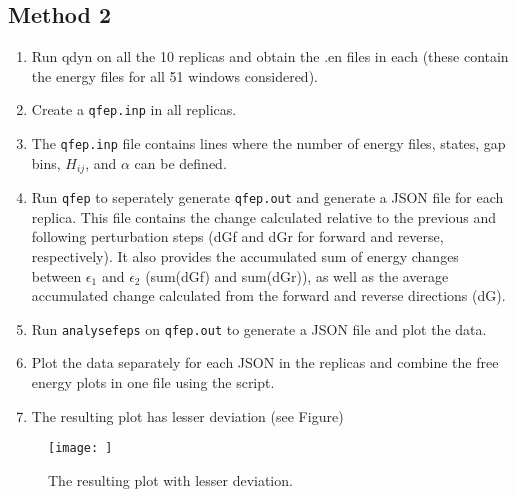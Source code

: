 \documentclass{article}
\begin{document}
\subsection{Method 2}

\begin{enumerate}
    \item Run qdyn on all the 10 replicas and obtain the .en files in each (these contain the energy files for all 51 windows considered).
    \item Create a \texttt{qfep.inp} in all replicas.
     \item The \texttt{qfep.inp} file contains lines where the number of energy files, states, gap bins, \(H_{ij}\), and \(\alpha\) can be defined.
    \item Run \texttt{qfep} to seperately generate \texttt{qfep.out} and generate a JSON file for each replica.
    This file contains the change calculated relative to the previous and following perturbation steps (dGf and dGr for forward and reverse, respectively). It also provides the accumulated sum of energy changes between \(\epsilon_1\) and \(\epsilon_2\) (sum(dGf) and sum(dGr)), as well as the average accumulated change calculated from the forward and reverse directions (dG).
    \item Run \texttt{analysefeps} on \texttt{qfep.out} to generate a JSON file and plot the data.
    \item Plot the data separately for each JSON in the replicas and combine the free energy plots in one file using the script.
    \item The resulting plot has lesser deviation (see Figure)
\end{enumerate}

\begin{figure}[h] %
    \centering
    \texttt{[image: ]} %
    \caption{The resulting plot with lesser deviation.}
    \label{fig:noise}
\end{figure}
\end{document}
